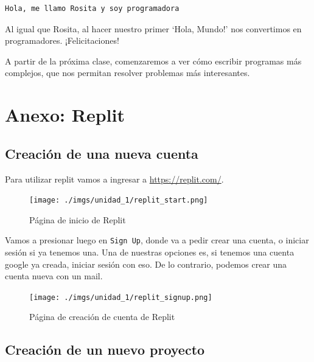 \documentclass[
  letterpaper,
  DIV=11,
  numbers=noendperiod]{scrreprt}
\begin{document}
\begin{verbatim}
Hola, me llamo Rosita y soy programadora
\end{verbatim}

Al igual que Rosita, al hacer nuestro primer `Hola, Mundo!' nos
convertimos en programadores. ¡Felicitaciones!

A partir de la próxima clase, comenzaremos a ver cómo escribir programas
más complejos, que nos permitan resolver problemas más interesantes.

\section{Anexo: Replit}\label{anexo-replit}

\subsection{Creación de una nueva
cuenta}\label{creaciuxf3n-de-una-nueva-cuenta}

Para utilizar replit vamos a ingresar a \url{https://replit.com/}.\\

\begin{figure}[H]

{\centering \texttt{[image: ./imgs/unidad\_1/replit\_start.png]}

}

\caption{Página de inicio de Replit}

\end{figure}%

Vamos a presionar luego en \texttt{Sign\ Up}, donde va a pedir crear una
cuenta, o iniciar sesión si ya tenemos una. Una de nuestras opciones es,
si tenemos una cuenta google ya creada, iniciar sesión con eso. De lo
contrario, podemos crear una cuenta nueva con un mail.

\begin{figure}[H]

{\centering \texttt{[image: ./imgs/unidad\_1/replit\_signup.png]}

}

\caption{Página de creación de cuenta de Replit}

\end{figure}%

\subsection{Creación de un nuevo
proyecto}\label{creaciuxf3n-de-un-nuevo-proyecto}
\end{document}
